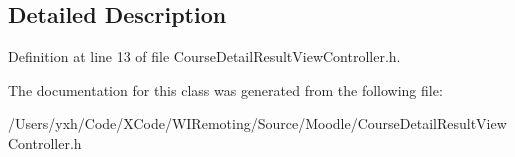 \subsection{Detailed Description}


Definition at line 13 of file CourseDetailResultViewController.h.

The documentation for this class was generated from the following file:\begin{DoxyCompactItemize}
\item 
/Users/yxh/Code/XCode/WIRemoting/Source/Moodle/CourseDetailResultViewController.h\end{DoxyCompactItemize}
